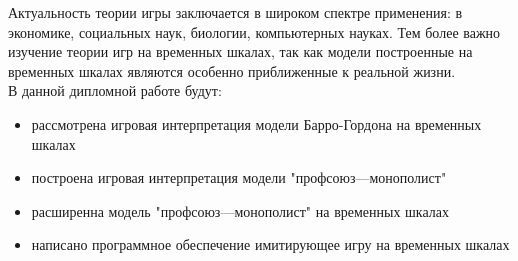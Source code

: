 Актуальность теории игры заключается в широком спектре применения: в экономике, социальных наук, биологии, компьютерных науках. Тем более важно изучение теории игр на временных шкалах, так как модели построенные на временных шкалах являются особенно приближенные к реальной жизни. \\
В данной дипломной работе будут:
\begin{itemize}
	\item рассмотрена игровая интерпретация модели Барро-Гордона на временных шкалах
	\item построена игровая интерпретация модели "профсоюз---монополист"
	\item расширенна модель "профсоюз---монополист" на временных шкалах
	\item написано программное обеспечение имитирующее игру на временных шкалах
\end{itemize} 
